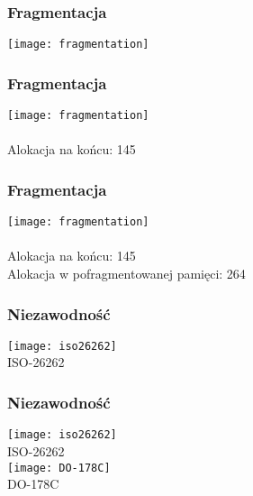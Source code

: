 \documentclass{beamer}
\begin{document}
\begin{frame}[t]
    \frametitle{Fragmentacja}

    \begin{center}
        \texttt{[image: fragmentation]}\\
        \tiny \cite{fragmentation} 
    \end{center}     
\end{frame}
\begin{frame}[t]
    \frametitle{Fragmentacja}

    \begin{center}
        \texttt{[image: fragmentation]}\\
        \tiny \cite{fragmentation} \\

        \normalsize Alokacja na końcu: 145\\
    \end{center}     
\end{frame}
\begin{frame}[t]
    \frametitle{Fragmentacja}

    \begin{center}
        \texttt{[image: fragmentation]}\\
        \tiny \cite{fragmentation} \\

        \normalsize Alokacja na końcu: 145\\
        \normalsize Alokacja w pofragmentowanej pamięci: 264
    \end{center}     
\end{frame}
\begin{frame}[t]
    \frametitle{Niezawodność}

    \begin{center}
        \texttt{[image: iso26262]}\\
        \tiny \cite{iso26262} ISO-26262\\
    \end{center}     
\end{frame}
\begin{frame}[t]
    \frametitle{Niezawodność}

    \begin{center}
        \texttt{[image: iso26262]}\\
        \tiny \cite{iso26262} ISO-26262\\
        \vspace{5 mm}
        \texttt{[image: DO-178C]}\\
        \tiny \cite{do178c} DO-178C\\        
    \end{center}     
\end{frame}
\end{document}
